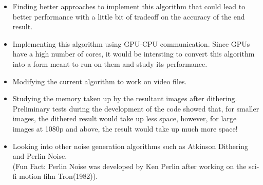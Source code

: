 \documentclass{article}
\begin{document}
\begin{itemize}

    \item Finding better approaches to implement this algorithm that could lead to better performance with a little bit of tradeoff on the accuracy of the end result.
    
    \item Implementing this algorithm using GPU-CPU communication\cite{Hartley}. Since GPUs have a high number of cores, it would be intersting to convert this algorithm into a form meant to run on them and study its performance.

    \item Modifying the current algorithm to work on video files.

    \item Studying the memory taken up by the resultant images after dithering. Preliminary tests during the development of the code showed that, for smaller images, the dithered result would take up less space, however, for large images at 1080p and above, the result would take up much more space!

    \item Looking into other noise generation algorithms such as Atkinson Dithering and Perlin Noise.\\ (Fun Fact: Perlin Noise was developed by Ken Perlin after working on the sci-fi motion film Tron(1982)).

\end{itemize}

\printbibliography[title={References}]
\end{document}
